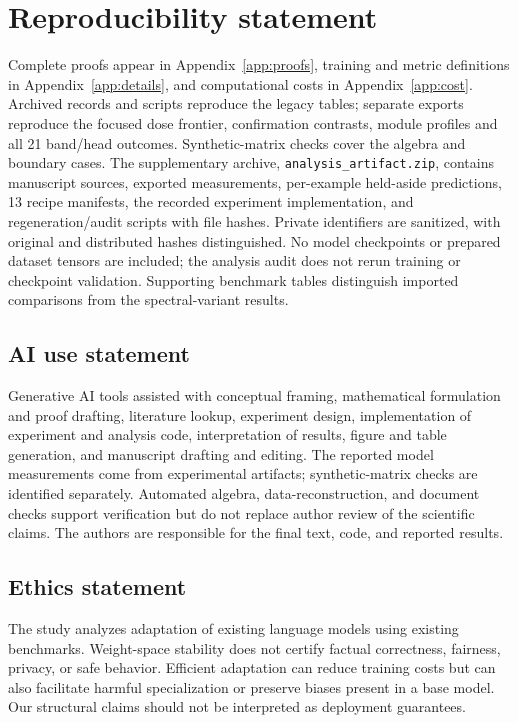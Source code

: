 \documentclass{article}
\begin{document}
\clearpage
\section*{Reproducibility statement}
Complete proofs appear in Appendix~\ref{app:proofs}, training and metric definitions in Appendix~\ref{app:details}, and computational costs in Appendix~\ref{app:cost}. Archived records and scripts reproduce the legacy tables; separate exports reproduce the focused dose frontier, confirmation contrasts, module profiles and all 21 band/head outcomes. Synthetic-matrix checks cover the algebra and boundary cases. The supplementary archive, \texttt{analysis\_artifact.zip}, contains manuscript sources, exported measurements, per-example held-aside predictions, 13 recipe manifests, the recorded experiment implementation, and regeneration/audit scripts with file hashes. Private identifiers are sanitized, with original and distributed hashes distinguished. No model checkpoints or prepared dataset tensors are included; the analysis audit does not rerun training or checkpoint validation. Supporting benchmark tables distinguish imported comparisons from the spectral-variant results.

\begin{samepage}
\section*{AI use statement}
Generative AI tools assisted with conceptual framing, mathematical formulation and proof drafting, literature lookup, experiment design, implementation of experiment and analysis code, interpretation of results, figure and table generation, and manuscript drafting and editing. The reported model measurements come from experimental artifacts; synthetic-matrix checks are identified separately. Automated algebra, data-reconstruction, and document checks support verification but do not replace author review of the scientific claims. The authors are responsible for the final text, code, and reported results.
\par\end{samepage}

\begin{samepage}
\section*{Ethics statement}
The study analyzes adaptation of existing language models using existing benchmarks. Weight-space stability does not certify factual correctness, fairness, privacy, or safe behavior. Efficient adaptation can reduce training costs but can also facilitate harmful specialization or preserve biases present in a base model. Our structural claims should not be interpreted as deployment guarantees.\par
\end{samepage}


\clearpage
\appendix
\end{document}
